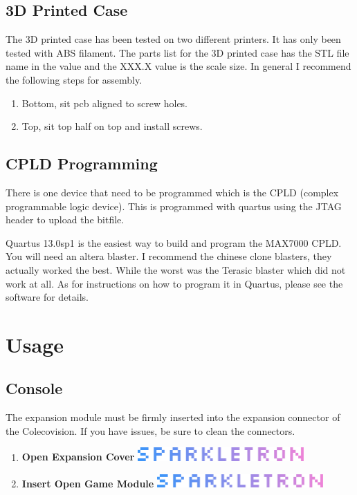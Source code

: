 \subsection{3D Printed Case}

\par
The 3D printed case has been tested on two different printers. It has only been tested with ABS filament.
The parts list for the 3D printed case has the STL file name in the value and the XXX.X value is the scale size.
In general I recommend the following steps for assembly.

\begin{enumerate}
  \item Bottom, sit pcb aligned to screw holes.
  \item Top, sit top half on top and install screws.
\end{enumerate}

\subsection{CPLD Programming}

\par
There is one device that need to be programmed which is the CPLD (complex programmable logic device).
This is programmed with quartus using the JTAG header to upload the bitfile.
\par
Quartus 13.0sp1 is the easiest way to build and program the MAX7000 CPLD. You will need an altera blaster.
I recommend the chinese clone blasters, they actually worked the best. While the worst was the Terasic blaster
which did not work at all. As for instructions on how to program it in Quartus, please see the software for details.

\newpage

\section{Usage}

\subsection{Console}
\par
The expansion module must be firmly inserted into the expansion connector of the Colecovision. If you have issues, be sure
to clean the connectors.

\begin{enumerate}
  \item \textbf{Open Expansion Cover} \includegraphics[width=0.50\textwidth,keepaspectratio]{img/SPARKLETRON.png}
  \item \textbf{Insert Open Game Module} \includegraphics[width=0.50\textwidth,keepaspectratio]{img/SPARKLETRON.png}
\end{enumerate}

